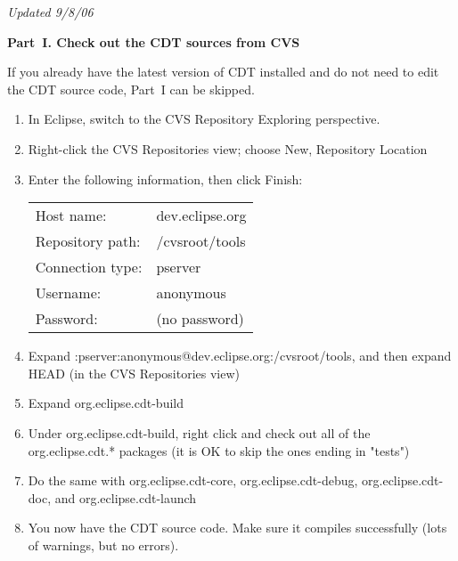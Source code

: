 
\textit{Updated 9/8/06}

\hspace{1em}\textbf{Part~I.  Check out the CDT sources from CVS}

If you already have the latest version of CDT installed and do not need
to edit the CDT source code, Part~I can be skipped.

\begin{enumerate}
\item  In Eclipse, switch to the CVS Repository Exploring perspective.
\item  Right-click the CVS Repositories view; choose New, Repository Location
\item  Enter the following information, then click Finish: \\
\begin{tabular}{ll}
         Host name:       & dev.eclipse.org \\
         Repository path: & /cvsroot/tools \\
         Connection type: & pserver \\
         Username:        & anonymous \\
         Password:        & (no password) \\
\end{tabular}
\item  Expand :pserver:anonymous@dev.eclipse.org:/cvsroot/tools,
    and then expand HEAD (in the CVS Repositories view)
\item  Expand org.eclipse.cdt-build
\item  Under org.eclipse.cdt-build, right click and check out all of the org.eclipse.cdt.* packages
    (it is OK to skip the ones ending in "tests")
\item  Do the same with org.eclipse.cdt-core, org.eclipse.cdt-debug,
    org.eclipse.cdt-doc, and org.eclipse.cdt-launch
\item You now have the CDT source code.  Make sure it compiles successfully
    (lots of warnings, but no errors).


\end{enumerate}
